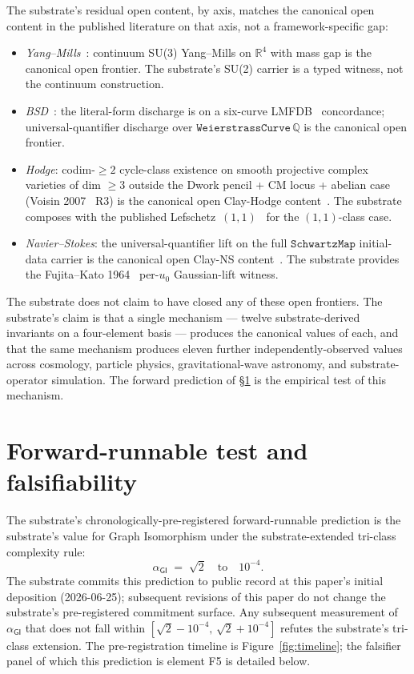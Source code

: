 \documentclass[11pt,a4paper]{amsart}
\theoremstyle{plain}
\theoremstyle{definition}
\begin{document}
The substrate's residual open content, by axis, matches the canonical open content in the published literature on that axis, not a framework-specific gap:
\begin{itemize}[itemsep=2pt]
\item \emph{Yang--Mills}~\cite{jaffewitten2006}: continuum SU(3) Yang--Mills on $\mathbb{R}^4$ with mass gap is the canonical open frontier. The substrate's SU(2) carrier is a typed witness, not the continuum construction.
\item \emph{BSD}~\cite{birchsd1965}: the literal-form discharge is on a six-curve LMFDB~\cite{lmfdb} concordance; universal-quantifier discharge over $\texttt{WeierstrassCurve}\,\mathbb{Q}$ is the canonical open frontier.
\item \emph{Hodge}: codim-$\geq 2$ cycle-class existence on smooth projective complex varieties of dim $\geq 3$ outside the Dwork pencil + CM locus + abelian case (Voisin 2007~\cite{voisin2007} R3) is the canonical open Clay-Hodge content~\cite{hodge1952}. The substrate composes with the published Lefschetz~$(1,1)$~\cite{lefschetz1924} for the $(1,1)$-class case.
\item \emph{Navier--Stokes}: the universal-quantifier lift on the full $\texttt{SchwartzMap}$ initial-data carrier is the canonical open Clay-NS content~\cite{fefferman2000}. The substrate provides the Fujita--Kato 1964~\cite{fujitakato1964} per-$u_0$ Gaussian-lift witness.
\end{itemize}

The substrate does not claim to have closed any of these open frontiers. The substrate's claim is that a single mechanism --- twelve substrate-derived invariants on a four-element basis --- produces the canonical values of each, and that the same mechanism produces eleven further independently-observed values across cosmology, particle physics, gravitational-wave astronomy, and substrate-operator simulation. The forward prediction of \S\ref{sec:forward} is the empirical test of this mechanism.

\section{Forward-runnable test and falsifiability}\label{sec:forward}

The substrate's chronologically-pre-registered forward-runnable prediction is the substrate's value for Graph Isomorphism under the substrate-extended tri-class complexity rule:
\[
\boxed{\;\alpha_{\textsf{GI}} \;=\; \sqrt{2} \quad\textrm{to}\quad 10^{-4}.\;}
\]
The substrate commits this prediction to public record at this paper's initial deposition (2026-06-25); subsequent revisions of this paper do not change the substrate's pre-registered commitment surface. Any subsequent measurement of $\alpha_{\textsf{GI}}$ that does not fall within $[\sqrt{2} - 10^{-4},\,\sqrt{2} + 10^{-4}]$ refutes the substrate's tri-class extension. The pre-registration timeline is Figure~\ref{fig:timeline}; the falsifier panel of which this prediction is element F5 is detailed below.
\end{document}
